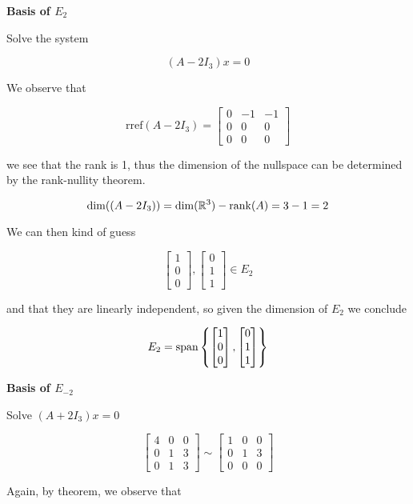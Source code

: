 \begin{sol}
	\textbf{Basis of $E_2$}

	Solve the system

	\[(A - 2I_3)x = 0\]

	We observe that 

	\[\mathrm{rref}(A - 2I_3) = \begin{bmatrix}
		0&-1&-1\\0&0&0\\0&0&0
	\end{bmatrix}\]

	we see that the rank is 1, thus the dimension of the nullspace can be determined by the rank-nullity theorem.

	\[\dim(\null(A - 2I_3)) = \dim(\mathbb{R}^3) - \rank(A) = 3 - 1 = 2\]

	We can then kind of guess

	\[\begin{bmatrix}
		1\\0\\0
	\end{bmatrix}, \begin{bmatrix}
		0\\1\\1
	\end{bmatrix} \in E_2\]

	and that they are linearly independent, so given the dimension of $E_2$ we conclude

	\[E_2 = \mathrm{span}\left\{\begin{bmatrix}
		1\\0\\0
	\end{bmatrix}, \begin{bmatrix}
		0\\1\\1
	\end{bmatrix}\right\}\]

	\textbf{Basis of $E_{-2}$}

	Solve $(A + 2 I_3) x = 0$

	\[\begin{bmatrix}
		4&0&0\\0&1&3\\0&1&3
	\end{bmatrix} \sim \begin{bmatrix}
		1&0&0\\0&1&3\\0&0&0
	\end{bmatrix}\]

	Again, by theorem, we observe that


\end{sol}
